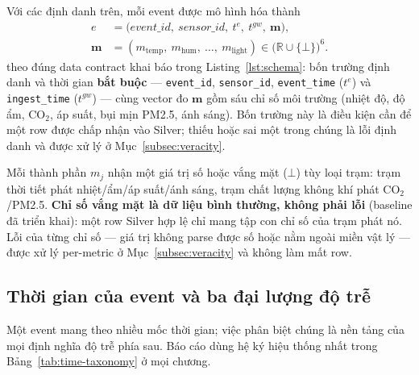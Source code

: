 Với các định danh trên, mỗi event được mô hình hóa thành
\begin{equation}
  \begin{aligned}
    e &= \bigl(\mathit{event\_id},\ \mathit{sensor\_id},\ t^{e},\ t^{gw},\
         \mathbf{m}\bigr), \\
    \mathbf{m} &= (m_{\mathrm{temp}},\ m_{\mathrm{hum}},\ \ldots,\
         m_{\mathrm{light}}) \in \bigl(\mathbb{R} \cup \{\bot\}\bigr)^{6}.
  \end{aligned}
  \label{eq:event-tuple}
\end{equation}
theo đúng data contract khai báo trong Listing~\ref{lst:schema}: bốn trường
định danh và thời gian \textbf{bắt buộc} --- \texttt{event\_id},
\texttt{sensor\_id}, \texttt{event\_time} ($t^{e}$) và \texttt{ingest\_time}
($t^{gw}$) --- cùng vector đo $\mathbf{m}$ gồm sáu chỉ số môi trường (nhiệt
độ, độ ẩm, CO$_2$, áp suất, bụi mịn PM2.5, ánh sáng). Bốn trường này là điều
kiện cần để một row được chấp nhận vào Silver; thiếu hoặc sai một trong
chúng là lỗi định danh và được xử lý ở Mục~\ref{subsec:veracity}.

Mỗi thành phần $m_j$ nhận một giá trị số hoặc vắng mặt ($\bot$) tùy loại
trạm: trạm thời tiết phát nhiệt/ẩm/áp suất/ánh sáng, trạm chất lượng không
khí phát CO$_2$/PM2.5. \textbf{Chỉ số vắng mặt là dữ liệu bình thường,
không phải lỗi} (baseline đã triển khai): một row Silver hợp lệ chỉ mang tập
con chỉ số của trạm phát nó. Lỗi của từng chỉ số --- giá trị không parse
được số hoặc nằm ngoài miền vật lý --- được xử lý per-metric ở
Mục~\ref{subsec:veracity} và không làm mất row.

\subsection{Thời gian của event và ba đại lượng độ trễ}
\label{subsec:lateness}

Một event mang theo nhiều mốc thời gian; việc phân biệt chúng là nền tảng
của mọi định nghĩa độ trễ phía sau. Báo cáo dùng hệ ký hiệu thống nhất
trong Bảng~\ref{tab:time-taxonomy} ở mọi chương.

